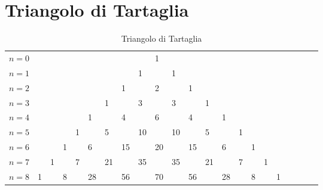 \section{Triangolo di Tartaglia}
\label{sec:TriangolodiTartaglia}
\begin{table}[H]
\centering
\setlength{\tabcolsep}{0pt}
\begin{tabular}{l<{\qquad}*{21}{T}} 
$n=0$&&&&&&&&&1\\
$n=1$&&&&&&&&1&&1\\
$n=2$&&&&&&&1&&2&&1\\
$n=3$&&&&&&1&&3&&3&&1\\
$n=4$&&&&&1&&4&&6&&4&&1\\
$n=5$&&&&1&&5&&10&&10&&5&&1\\
$n=6$&&&1&&6&&15&&20&&15&&6&&1\\
$n=7$&&1&&7&&21&&35&&35&&21&&7&&1\\
$n=8$&1&&8&&28&&56&&70&&56&&28&&8&&1\\

\end{tabular}
\caption{Triangolo di Tartaglia}
\label{tab:trinagoloditartaglia}
\end{table}
